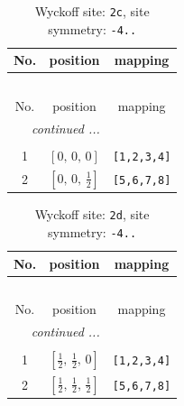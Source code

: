 \documentclass[fleqn,8pt]{jsarticle}
\begin{document}
\renewcommand{\arraystretch}{1.2}
\begin{longtable}{ccc}
\caption{Wyckoff site: {\tt 2c}, site symmetry: {\tt -4..}}
 \\
 \hline \hline
No. & position & mapping \\ \hline \endfirsthead

\multicolumn{2}{l}{\tablename\ \thetable{}} \\
 \hline \hline
No. & position & mapping \\ \hline \endhead

 \hline \hline
\multicolumn{2}{r}{\footnotesize\it continued ...} \\ \endfoot

 \hline \hline
\multicolumn{2}{r}{} \\ \endlastfoot

1 & $\left[ 0,\, 0,\, 0 \right]$ & {\tt [1,2,3,4]} \\ \hline
2 & $\left[ 0,\, 0,\, \frac{1}{2} \right]$ & {\tt [5,6,7,8]} \\
\end{longtable}
\renewcommand{\arraystretch}{1.2}
\begin{longtable}{ccc}
\caption{Wyckoff site: {\tt 2d}, site symmetry: {\tt -4..}}
 \\
 \hline \hline
No. & position & mapping \\ \hline \endfirsthead

\multicolumn{2}{l}{\tablename\ \thetable{}} \\
 \hline \hline
No. & position & mapping \\ \hline \endhead

 \hline \hline
\multicolumn{2}{r}{\footnotesize\it continued ...} \\ \endfoot

 \hline \hline
\multicolumn{2}{r}{} \\ \endlastfoot

1 & $\left[ \frac{1}{2},\, \frac{1}{2},\, 0 \right]$ & {\tt [1,2,3,4]} \\ \hline
2 & $\left[ \frac{1}{2},\, \frac{1}{2},\, \frac{1}{2} \right]$ & {\tt [5,6,7,8]} \\
\end{longtable}
\renewcommand{\arraystretch}{1.2}
\end{document}
